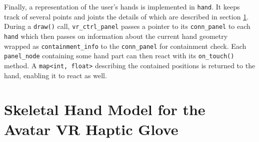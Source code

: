 \documentclass[hyperref, bachelorofscience]{cgvpub}
\begin{document}
Finally, a representation of the user's hands is implemented in \lstinline|hand|. It keeps track of several points and joints the details of which are described in section \ref{sec:hand_model}. During a \lstinline|draw()| call, \lstinline|vr_ctrl_panel| passes a pointer to its \lstinline|conn_panel| to each \lstinline|hand| which then passes on information about the current hand geometry wrapped as \lstinline|containment_info| to the \lstinline|conn_panel| for containment check. Each \lstinline|panel_node| containing some hand part can then react with its \lstinline|on_touch()| method. A \lstinline|map<int, float>| describing the contained positions is returned to the hand, enabling it to react as well.

\section{Skeletal Hand Model for the Avatar VR Haptic Glove} \label{sec:hand_model}
\end{document}
